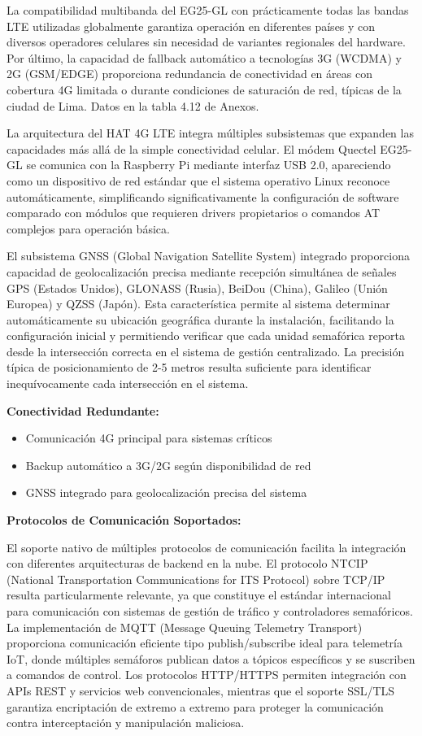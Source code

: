 \documentclass[12pt,a4paper,oneside]{report}
\begin{document}
La compatibilidad multibanda del EG25-GL con prácticamente todas las bandas LTE utilizadas globalmente garantiza operación en diferentes países y con diversos operadores celulares sin necesidad de variantes regionales del hardware. Por último, la capacidad de fallback automático a tecnologías 3G (WCDMA) y 2G (GSM/EDGE) proporciona redundancia de conectividad en áreas con cobertura 4G limitada o durante condiciones de saturación de red, típicas de la ciudad de Lima. Datos en la tabla 4.12 de Anexos.

La arquitectura del HAT 4G LTE integra múltiples subsistemas que expanden las capacidades más allá de la simple conectividad celular. El módem Quectel EG25-GL se comunica con la Raspberry Pi mediante interfaz USB 2.0, apareciendo como un dispositivo de red estándar que el sistema operativo Linux reconoce automáticamente, simplificando significativamente la configuración de software comparado con módulos que requieren drivers propietarios o comandos AT complejos para operación básica.

El subsistema GNSS (Global Navigation Satellite System) integrado proporciona capacidad de geolocalización precisa mediante recepción simultánea de señales GPS (Estados Unidos), GLONASS (Rusia), BeiDou (China), Galileo (Unión Europea) y QZSS (Japón). Esta característica permite al sistema determinar automáticamente su ubicación geográfica durante la instalación, facilitando la configuración inicial y permitiendo verificar que cada unidad semafórica reporta desde la intersección correcta en el sistema de gestión centralizado. La precisión típica de posicionamiento de 2-5 metros resulta suficiente para identificar inequívocamente cada intersección en el sistema.

\textbf{Conectividad Redundante:}

\begin{itemize}
\item
  Comunicación 4G principal para sistemas críticos
\item
  Backup automático a 3G/2G según disponibilidad de red
\item
  GNSS integrado para geolocalización precisa del sistema
\end{itemize}

\textbf{Protocolos de Comunicación Soportados:}

El soporte nativo de múltiples protocolos de comunicación facilita la integración con diferentes arquitecturas de backend en la nube. El protocolo NTCIP (National Transportation Communications for ITS Protocol) sobre TCP/IP resulta particularmente relevante, ya que constituye el estándar internacional para comunicación con sistemas de gestión de tráfico y controladores semafóricos. La implementación de MQTT (Message Queuing Telemetry Transport) proporciona comunicación eficiente tipo publish/subscribe ideal para telemetría IoT, donde múltiples semáforos publican datos a tópicos específicos y se suscriben a comandos de control. Los protocolos HTTP/HTTPS permiten integración con APIs REST y servicios web convencionales, mientras que el soporte SSL/TLS garantiza encriptación de extremo a extremo para proteger la comunicación contra interceptación y manipulación maliciosa.
\end{document}

